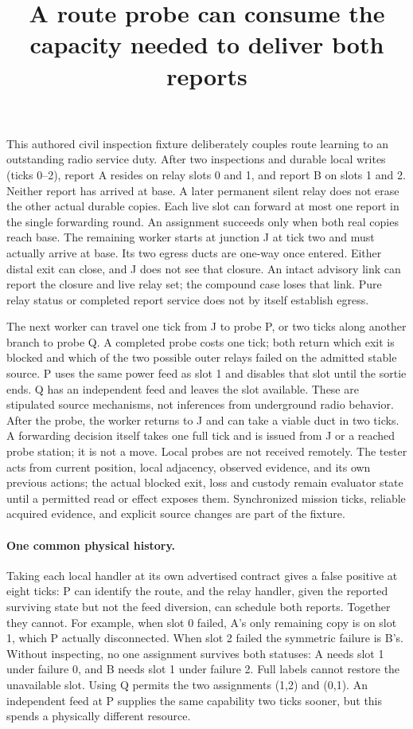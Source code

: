 \documentclass[11pt]{article}
\title{A route probe can consume the capacity needed to deliver both reports}
\author{}\date{}
\begin{document}
\maketitle
This authored civil inspection fixture deliberately couples route learning
to an outstanding radio service duty. After two inspections and durable
local writes (ticks 0--2), report A resides on relay slots 0 and 1, and
report B on slots 1 and 2. Neither report has arrived at base. A later
permanent silent relay does not erase the other actual durable copies.
Each live slot can forward at most one report in the single forwarding
round. An assignment succeeds only when both real copies reach base.
The remaining worker starts at junction J at tick two and must actually
arrive at base. Its two egress ducts are one-way once entered. Either
distal exit can close, and J does not see that closure. An intact
advisory link can report the closure and live relay set; the compound
case loses that link. Pure relay status or completed report service
does not by itself establish egress.

The next worker can travel one tick from J to probe P, or two ticks
along another branch to probe Q. A completed probe costs one tick;
both return which exit is blocked and which of the two possible
outer relays failed on the admitted stable source. P uses the same
power feed as slot 1 and disables that slot until the sortie ends.
Q has an independent feed and leaves the slot available. These
are stipulated source mechanisms, not inferences from underground
radio behavior. After the probe, the worker returns to J and can
take a viable duct in two ticks. A forwarding decision itself takes
one full tick and is issued from J or a reached probe station; it is
not a move. Local probes are not received remotely. The tester acts
from current position, local adjacency, observed evidence, and its
own previous actions; the actual blocked exit, loss and custody
remain evaluator state until a permitted read or effect exposes them.
Synchronized mission ticks, reliable acquired evidence, and explicit
source changes are part of the fixture.

\paragraph{One common physical history.}
Taking each local handler at its own advertised contract gives a
false positive at eight ticks: P can identify the route, and the
relay handler, given the reported surviving state but not the
feed diversion, can schedule both reports. Together they cannot.
For example, when slot 0 failed, A's only remaining copy is on
slot 1, which P actually disconnected. When slot 2 failed the
symmetric failure is B's. Without inspecting, no one assignment
survives both statuses: A needs slot 1 under failure 0, and B needs
slot 1 under failure 2. Full labels cannot restore the unavailable slot.
Using Q permits the two assignments (1,2) and (0,1). An independent
feed at P supplies the same capability two ticks sooner, but this
spends a physically different resource.
\end{document}

